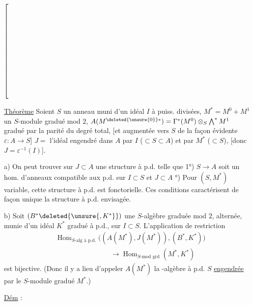 \noindent$\left[\vphantom{\rule{0pt}{6\baselineskip}}\right.$\begin{minipage}{.90\linewidth}
\uline{Théorème} Soient $S$ un anneau muni d'un idéal $I$ à puiss. divisées, $M^\ast=M^0+M^1$ un $S$-module gradué mod $2$,
$A(M^{\deleted{\unsure{0}}\ast})=\Gamma^\ast(M^0)\otimes_S\bigwedge^\ast M^1$  gradué par la parité du degré total, [et augmentée vers $S$ de la façon évidente $\varepsilon:A\longrightarrow S$]
$J=$ l'idéal engendré dans $A$ par $I$ ($\subset S\subset A$) et par $M^\ast$ ($\subset S$), [donc $J=\varepsilon^{-1}(I)$].
\end{minipage}

a) On peut trouver sur  $J\subset A$ une structure à p.d. telle que 1°) $S\longrightarrow A$ soit un hom. d'anneaux compatible aux p.d. sur $I\subset S$ et $J\subset A$ °) Pour $(S,M^\ast)$ variable, cette structure à p.d. est fonctorielle. Ces conditions caractérisent de façon unique la structure à p.d. envisagée.

b) Soit $(B^\ast\deleted{\unsure{,K^\ast}})$ une $S$-algèbre graduée mod $2$,  alternée, munie d'un idéal $K^\ast$ gradué à p.d.,   sur $I\subset S$.
L'application de restriction
\[
\begin{aligned}
&\operatorname{Hom}_{S\text{-alg à p.d.}}\bigl((A(M^\ast),J(M^\ast)),(B^\ast,K^\ast)\bigr)\\
&\hspace{8em}\longrightarrow\operatorname{Hom}_{S\text{-mod grd}}(M^\ast,K^\ast)
\end{aligned}
\]
est bijective. (Donc il y a lieu d'appeler $A(M^\ast)$
la -algèbre  à p.d.  $S$ \uline{engendrée} par le $S$-module gradué $M^\ast$.)

\uline{Dém} :
